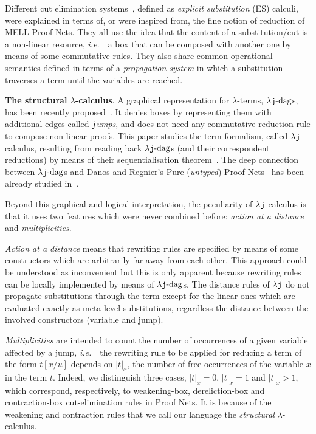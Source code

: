 \documentclass{LMCS}
\newcommand{\ie}{{\it  i.e.}~}
\renewcommand{\>}{\rightarrow}
\def\lam{\lambda}
\newcommand{\dis}{{\tt j}}
\newcommand{\ldis}{\lam{\dis}}
\newcommand{\ljdag}{\lam\jop\mbox{-dag}}
\newcommand{\deft}[1]{{\bf #1}}
\newcommand{\jop}{{\tt j}}
\begin{document}
Different cut elimination systems~\cite{DCKP03,KL07,Kes07}, defined as
\textit{explicit substitution} (ES) calculi, were explained in terms
of, or were inspired from, the fine notion of reduction of MELL
Proof-Nets. They all use the idea that the content of a
substitution/cut is a non-linear resource, \ie\ a box that can be
composed with another one by means of some commutative rules.
They also share common operational semantics defined in terms of
a \textit{propagation system} in which a substitution traverses a term
until the variables are reached.\medskip
  

\deft{The  structural $\lam$-calculus}.  A graphical  representation for
$\lam$-terms,  $\ljdag$s, has  been  recently proposed~\cite{AG09}.   It
denies  boxes  by  representing  them  with  additional  edges  called
\textit{{\tt j}umps}, and does not need any commutative reduction rule
to  compose non-linear  proofs.  This  paper studies  the term
formalism,  called  $\ldis$-calculus,   resulting  from  reading  back
$\ljdag$s  (and  their correspondent  reductions)  by  means of  their
sequentialisation  theorem~\cite{AG09}.  The  deep connection  between
$\ljdag$s   and   Danos    and   Regnier's   Pure   (\textit{untyped})
Proof-Nets~\cite{Danos99opt}     has      been     already     studied
in~\cite{AccattoliTh}.

Beyond this  graphical and logical interpretation,  the peculiarity of
$\ldis$-calculus  is  that  it  uses  two 
features  which  were  never  combined before:  \textit{action  at  a
  distance} and \textit{multiplicities}.

\textit{Action at a distance} means
  that rewriting rules are specified by means of
  some constructors which are arbitrarily far away from each other. This
approach could be understood as inconvenient
but this is only apparent because rewriting rules can be
locally implemented by means of $\ljdag$s. The distance rules of $\ldis$ do not propagate
substitutions through the term except
for the linear ones which are evaluated exactly as meta-level substitutions,
regardless the distance between the  involved constructors (variable and jump).

\textit{Multiplicities} are intended to count the number of
occurrences of a given variable affected by a jump,
  \ie\ the  rewriting rule to be applied for reducing a term of the
form $t[x/u]$ depends on $|t|_x$, the number
  of free occurrences of the variable $x$ in the term
  $t$. Indeed, we distinguish three cases,
$|t|_x=0$, $|t|_x=1$ and $|t|_x >1$, which
correspond, respectively,  to 
 weakening-box, dereliction-box and contraction-box
cut-elimination rules in Proof Nets.
It is because of the weakening and
contraction rules that we call our language the \textit{structural}
$\lam$-calculus.\medskip
\end{document}
